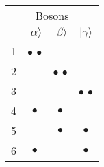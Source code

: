 \documentclass[11pt]{article}
\begin{document}
\begin{table}[h]
\renewcommand{\arraystretch}{1.2}
\begin{tabular}{c|ccc}
\multicolumn{4}{c}{Bosons} \\
&  $|\alpha\rangle$ & $|\beta\rangle$ & $|\gamma\rangle$ \\
\hline\hline
1 & $\bullet$ $\bullet$ & & \\ \hline
2 & & $\bullet$ $\bullet$ & \\  \hline
3 & & & $\bullet$ $\bullet$ \\  \hline
4 &  $\bullet$ & $\bullet$ & \\  \hline
5 & & $\bullet$ &  $\bullet$ \\  \hline
6 &  $\bullet$ & & $\bullet$ \\  
\hline\hline
\end{tabular}
\end{table}
\end{document}
